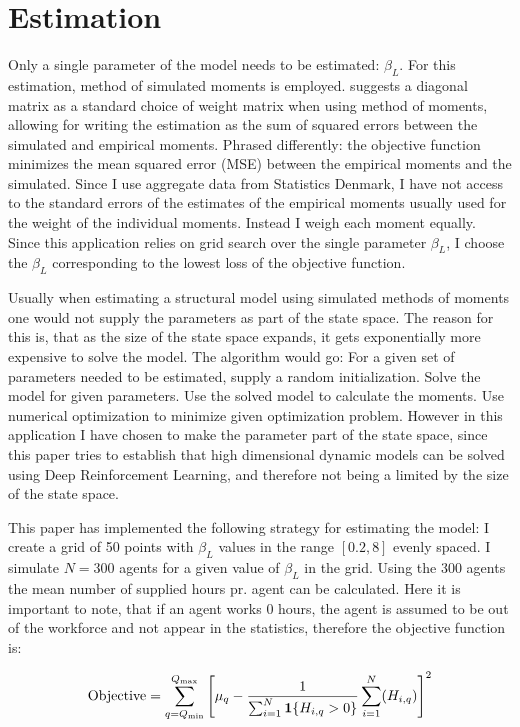 \section{Estimation}

Only a single parameter of the model needs to be estimated: $\beta_L$. For this estimation, method of simulated moments is employed.  \textcite{eisenhauer_estimation_2015} suggests a diagonal matrix as a standard choice of weight matrix when using method of moments, allowing for writing the estimation as the sum of squared errors between the simulated and empirical moments. Phrased differently: the objective function minimizes the mean squared error (MSE) between the empirical moments and the simulated. Since I use aggregate data from Statistics Denmark, I have not access to the standard errors of the estimates of the empirical moments usually used for the weight of the individual moments. Instead I weigh each moment equally. Since this application relies on grid search over the single parameter $\beta_L$, I choose the $\beta_L$ corresponding to the lowest loss of the objective function. 

Usually when estimating a structural model using simulated methods of moments one would not supply the parameters as part of the state space. The reason for this is, that as the size of the state space expands, it gets exponentially more expensive to solve the model. The algorithm would go: For a given set of parameters needed to be estimated, supply a random initialization. Solve the model for given parameters. Use the solved model to calculate the moments. Use numerical optimization to minimize given optimization problem. However in this application I have chosen to make the parameter part of the state space, since this paper tries to establish that high dimensional dynamic models can be solved using Deep Reinforcement Learning, and therefore not being a limited by the size of the state space.

This paper has implemented the following strategy for estimating the model: I create a grid of 50 points with $\beta_L$ values in the range $[0.2, 8]$ evenly spaced. I simulate $N=300$ agents for a given value of $\beta_L$ in the grid. Using the 300 agents the mean number of supplied hours pr. agent can be calculated. Here it is important to note, that if an agent works 0 hours, the agent is assumed to be out of the workforce and not appear in the statistics, therefore the objective function is:

\begin{equation}
    \text{Objective} = \sum_{q=Q_{\min}}^{Q_{\max}} \left[ \mu_{q} -\frac{1}{\sum_{i=1}^{N} \mathbf{1}\{H_{i,q} > 0\}}\sum_{i=1}^N (H_{i,q})\right]^2
\end{equation}

